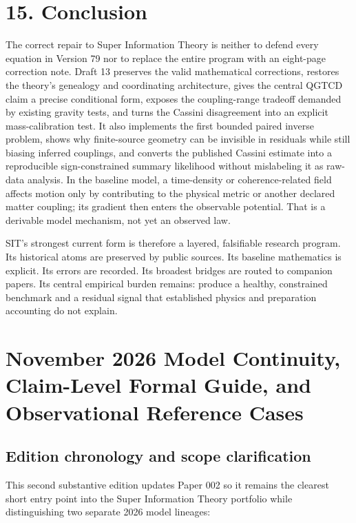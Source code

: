 \documentclass[
  american,
  11pt,
  letterpaper,
]{article}
\begin{document}
\section{15. Conclusion}\label{conclusion}

The correct repair to Super Information Theory is neither to defend every equation in Version 79 nor to replace the entire program with an eight-page correction note. Draft 13 preserves the valid mathematical corrections, restores the theory's genealogy and coordinating architecture, gives the central QGTCD claim a precise conditional form, exposes the coupling-range tradeoff demanded by existing gravity tests, and turns the Cassini disagreement into an explicit mass-calibration test. It also implements the first bounded paired inverse problem, shows why finite-source geometry can be invisible in residuals while still biasing inferred couplings, and converts the published Cassini estimate into a reproducible sign-constrained summary likelihood without mislabeling it as raw-data analysis. In the baseline model, a time-density or coherence-related field affects motion only by contributing to the physical metric or another declared matter coupling; its gradient then enters the observable potential. That is a derivable model mechanism, not yet an observed law.

SIT's strongest current form is therefore a layered, falsifiable research program. Its historical atoms are preserved by public sources. Its baseline mathematics is explicit. Its errors are recorded. Its broadest bridges are routed to companion papers. Its central empirical burden remains: produce a healthy, constrained benchmark and a residual signal that established physics and preparation accounting do not explain.

\section{November 2026 Model Continuity, Claim-Level Formal Guide, and Observational Reference Cases}\label{november-2026-model-continuity-claim-level-formal-guide-and-observational-reference-cases}

\subsection{Edition chronology and scope clarification}\label{edition-chronology-and-scope-clarification}

This second substantive edition updates Paper 002 so it remains the clearest short entry point into the Super Information Theory portfolio while distinguishing two separate 2026 model lineages:
\end{document}
